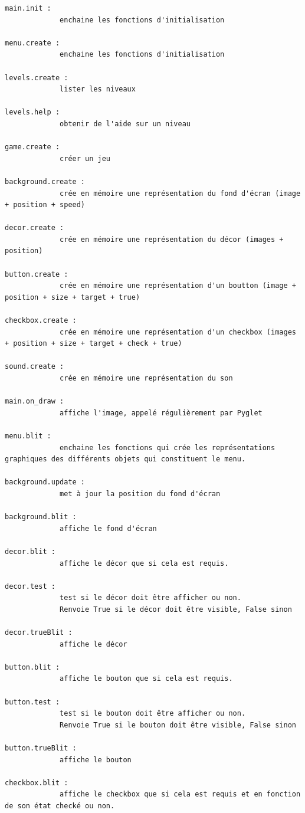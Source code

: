 \documentclass{article}
\begin{document}
\begin{verbatim}
main.init :
             enchaine les fonctions d'initialisation

menu.create :
             enchaine les fonctions d'initialisation

levels.create :
             lister les niveaux

levels.help :
             obtenir de l'aide sur un niveau

game.create :
             créer un jeu

background.create :
             crée en mémoire une représentation du fond d'écran (image + position + speed)

decor.create :
             crée en mémoire une représentation du décor (images + position)

button.create :
             crée en mémoire une représentation d'un boutton (image + position + size + target + true)

checkbox.create :
             crée en mémoire une représentation d'un checkbox (images + position + size + target + check + true)

sound.create :
             crée en mémoire une représentation du son

main.on_draw :
             affiche l'image, appelé régulièrement par Pyglet

menu.blit :
             enchaine les fonctions qui crée les représentations graphiques des différents objets qui constituent le menu.

background.update :
             met à jour la position du fond d'écran

background.blit :
             affiche le fond d'écran

decor.blit :
             affiche le décor que si cela est requis.

decor.test :
             test si le décor doit être afficher ou non. 
             Renvoie True si le décor doit être visible, False sinon

decor.trueBlit :
             affiche le décor

button.blit :
             affiche le bouton que si cela est requis.

button.test :
             test si le bouton doit être afficher ou non.
             Renvoie True si le bouton doit être visible, False sinon

button.trueBlit :
             affiche le bouton

checkbox.blit :
             affiche le checkbox que si cela est requis et en fonction de son état checké ou non.


\end{verbatim}
\end{document}
